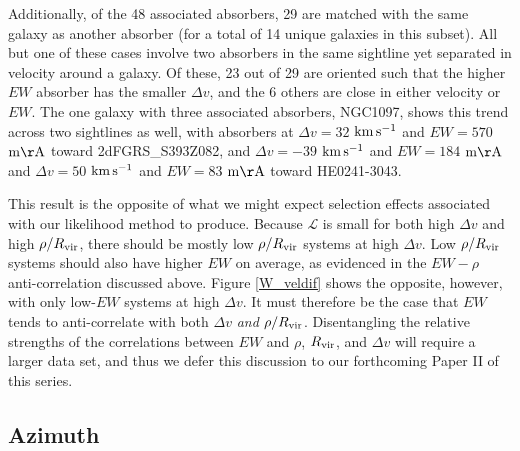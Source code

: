 Additionally, of the 48 associated absorbers, 29 are matched with the same galaxy as another absorber (for a total of 14 unique galaxies in this subset). All but one of these cases involve two absorbers in the same sightline yet separated in velocity around a galaxy. Of these, 23 out of 29 are oriented such that the higher $EW$ absorber has the smaller $\Delta v$, and the 6 others are close in either velocity or $EW$. The one galaxy with three associated absorbers, NGC1097, shows this trend across two sightlines as well, with absorbers at $\Delta v = 32$ $\rm km\, s^{-1}$ and $EW = 570$ $\rm m\AA$ toward 2dFGRS\_S393Z082, and $\Delta v = -39$ $\rm km\, s^{-1}$ and $EW = 184$ $\rm m\AA$ and $\Delta v = 50$ $\rm km\, s^{-1}$ and $EW = 83$ $\rm m\AA$ toward HE0241-3043.

This result is the opposite of what we might expect selection effects associated with our likelihood method to produce. Because $\mathcal{L}$ is small for both high $\Delta v$ and high $\rho / R_{\rm vir}$, there should be mostly low $\rho / R_{\rm vir}$ systems at high $\Delta v$. Low $\rho / R_{\rm vir}$ systems should also have higher $EW$ on average, as evidenced in the $EW-\rho$ anti-correlation discussed above. Figure \ref{W_veldif} shows the opposite, however, with only low-$EW$ systems at high $\Delta v$. It must therefore be the case that $EW$ tends to anti-correlate with both $\Delta v$ \textit{and} $\rho / R_{\rm vir}$. Disentangling the relative strengths of the correlations between $EW$ and $\rho$, $R_{\rm vir}$, and $\Delta v$ will require a larger data set, and thus we defer this discussion to our forthcoming Paper II of this series.

\vspace{10pt}

\subsection{Azimuth}
\label{azimuth}


